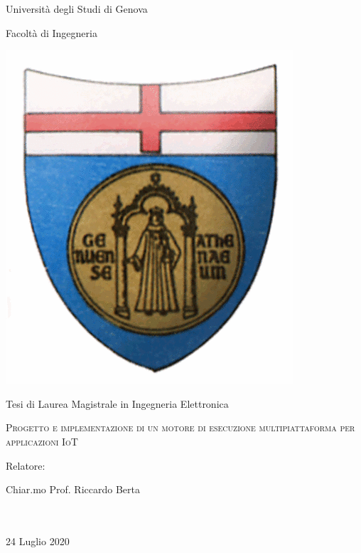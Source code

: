 \documentclass[12pt,oneside]{book}
\begin{document}
\begin{titlepage}
\thispagestyle{empty}
\centering
\begin{center}
	{\Huge Università degli Studi di Genova}	
\end{center}
\begin{center}
	{\LARGE Facoltà di Ingegneria}
\end{center}
\vspace{30pt}
\begin{center}
	\includegraphics[scale=0.35]{pics/logo_unige}
\end{center}
\vspace{30pt}
\begin{center}
	{\LARGE Tesi di Laurea Magistrale in Ingegneria Elettronica}
\end{center}
\vspace{30pt}
\begin{center} 
		\Huge \textsc{ Progetto e implementazione di un motore di esecuzione multipiattaforma per applicazioni IoT}
\end{center}
\vspace{50pt}
\raggedright{\Large Relatore:}
\hfill
{}\\
\vspace{10pt}
\raggedright{\Large Chiar.mo Prof. Riccardo Berta}
\hfill
{}\\
\vspace{10pt}
\\
\mbox{ }
\vspace{\fill}
\begin{center}
	{\large 24 Luglio 2020}
\end{center}
\end{titlepage}
\end{document}
